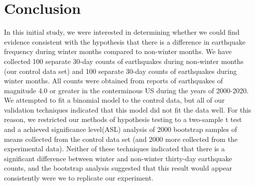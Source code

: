 \documentclass{amsart}
\begin{document}
\section{Conclusion}
In this initial study, we were interested in determining whether we could find evidence consistent with the hypothesis that there is a difference in earthquake frequency during winter months compared to non-winter months. We have collected 
100 separate 30-day counts of earthquakes during non-winter months (our control data set) and 100 separate 30-day counts of earthquakes during winter months. All counts were obtained from reports of earthquakes of magnitude 4.0 or greater in the conterminous US during the years of 2000-2020. We attempted to fit a binomial model to the control data, but all of our validation techniques indicated that this model did not fit the data well. For this reason, we restricted our methods of hypothesis testing to a two-sample t test and a achieved significance level(ASL) analysis of 2000 bootstrap samples of means collected from the control data set (and 2000 more collected from the experimental data). Neither of these techniques indicated that there is a significant difference between winter and non-winter thirty-day earthquake counts, and the bootstrap analysis suggested that this result would appear consistently were we to replicate our experiment.
\end{document}
